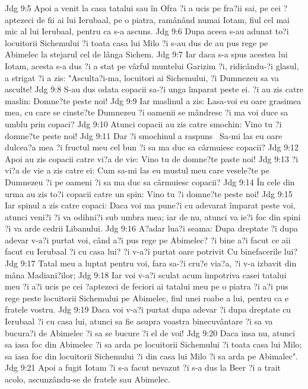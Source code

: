 Jdg 9:5  Apoi a venit la casa tatalui sau în Ofra ?i a ucis pe fra?ii sai, pe cei ?aptezeci de fii ai lui Ierubaal, pe o piatra, ramânând numai Iotam, fiul cel mai mic al lui Ierubaal, pentru ca s-a ascuns.
Jdg 9:6  Dupa aceea s-au adunat to?i locuitorii Sichemului ?i toata casa lui Milo ?i s-au dus de au pus rege pe Abimelec la stejarul cel de lânga Sichem.
Jdg 9:7  Iar daca s-a spus acestea lui Iotam, acesta s-a dus ?i a stat pe vârful muntelui Garizim ?i, ridicându-?i glasul, a strigat ?i a zis: "Asculta?i-ma, locuitori ai Sichemului, ?i Dumnezeu sa va asculte!
Jdg 9:8  S-au dus odata copacii sa-?i unga împarat peste ei. ?i au zis catre maslin: Domne?te peste noi!
Jdg 9:9  Iar maslinul a zis: Lasa-voi eu oare grasimea mea, cu care se cinste?te Dumnezeu ?i oamenii se mândresc ?i ma voi duce sa umblu prin copaci?
Jdg 9:10  Atunci copacii au zis catre smochin: Vino tu ?i domne?te peste noi!
Jdg 9:11  Dar ?i smochinul a raspuns  Sa-mi las eu oare dulcea?a mea ?i fructul meu cel bun ?i sa ma duc sa cârmuiesc copacii?
Jdg 9:12  Apoi au zis copacii catre vi?a de vie: Vino tu de domne?te paste noi!
Jdg 9:13  ?i vi?a de vie a zis catre ei: Cum sa-mi las eu mustul meu care vesele?te pe Dumnezeu ?i pe oameni ?i sa ma duc sa cârmuiesc copacii?
Jdg 9:14  În cele din urma au zis to?i copacii catre un spin: Vino tu ?i domne?te peste noi!
Jdg 9:15  Iar spinul a zis catre copaci: Daca voi ma pune?i cu adevarat împarat peste voi, atunci veni?i ?i va odihni?i sub umbra mea; iar de nu, atunci va ie?i foc din spini ?i va arde cedrii Libanului.
Jdg 9:16  A?adar lua?i seama: Dupa dreptate ?i dupa adevar v-a?i purtat voi, când a?i pus rege pe Abimelec? ?i bine a?i facut ce aii facut cu Ierubaal ?i cu casa lui? ?i v-a?i purtat oare potrivit Cu binefacerile lui?
Jdg 9:17  Tatal meu a luptat pentru voi, fara sa-?i cru?e via?a, ?i v-a izbavit din mâna Madiani?ilor;
Jdg 9:18  Iar voi v-a?i sculat acum împotriva casei tatalui meu ?i a?i ucis pe cei ?aptezeci de feciori ai tatalui meu pe o piatra ?i a?i pus rege peste locuitorii Sichemului pe Abimelec, fiul unei roabe a lui, pentru ca e fratele vostru.
Jdg 9:19  Daca voi v-a?i purtat dupa adevar ?i dupa dreptate cu Ierubaal ?i cu casa lui, atunci sa fie asupra voastra binecuvântare ?i sa va bucura?i de Abimelec ?i sa se bucure ?i el de voi!
Jdg 9:20  Daca insa nu, atunci sa iasa foc din Abimelec ?i sa arda pe locuitorii Sichemului ?i toata casa lui Milo; sa iasa foc din locuitorii Sichemului ?i din casa lui Milo ?i sa arda pe Abimalec".
Jdg 9:21  Apoi a fugit Iotam ?i s-a facut nevazut ?i s-a dus la Beer ?i a trait acolo, ascunzându-se de fratele sau Abimelec.
